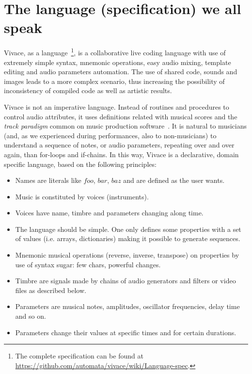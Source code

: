 \documentclass[12pt,times,twocolumn]{article}
\begin{document}
\section{The language (specification) we all speak}

Vivace, as a language~\footnote{The complete specification can be
  found at
  \url{https://github.com/automata/vivace/wiki/Language-spec}.}, is a
collaborative live coding language with use of extremely simple
syntax, mnemonic operations, easy audio mixing, template editing and
audio parameters automation. The use of shared code, sounds and images
leads to a more complex scenario, thus increasing the possibility of
inconsistency of compiled code as well as artistic
results.

Vivace is not an imperative language. Instead of routines and
procedures to control audio attributes, it uses definitions related
with musical scores and the \emph{track paradigm} common on music
production software~\cite{collins2011live}. It is natural to musicians (and, as we
experienced during performances, also to non-musicians) to understand
a sequence of notes, or audio parameters, repeating over and over
again, than for-loops and if-chains. In this way, Vivace is a
declarative, domain specific language, based on the following
principles:

\begin{itemize}
	\item Names are literals like $foo$, $bar$, $baz$ and are defined as
	  the user wants.
	\item Music is constituted by voices (instruments).
	\item Voices have name, timbre and parameters changing along time.
	\item The language should be simple. One only defines some properties with a set of
	  values (i.e. arrays, dictionaries) making it possible to generate
	  sequences.
	\item Mnemonic musical operations (reverse, inverse, transpose) on
	  properties by use of syntax sugar: few chars, powerful changes.
	\item Timbre are signals made by chains of audio generators and
	  filters or video files as described below.
	\item Parameters are musical notes, amplitudes, oscillator
	  frequencies, delay time and so on.
	\item Parameters change their values at specific times and for certain
  durations.
\end{itemize}
\end{document}
